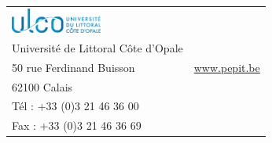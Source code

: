 \begin{titlepage}
\begin{center}
		\begin{footnotesize}
			\begin{tabular}{p{10cm} r}
			\includegraphics[width=3cm]{images/logo_ulco}
				&  \\ %
			Université de Littoral Côte d'Opale
				& \pepit{} \\
			50 rue Ferdinand Buisson 
				& \href{http://www.pepit.be}{www.pepit.be} \\
			62100 Calais
				&  \\ %
			Tél : +33 (0)3 21 46 36 00
				&  \\
			Fax : +33 (0)3 21 46 36 69
				&  \\
			\end{tabular}
		\end{footnotesize}
\end{center}

\end{titlepage}
\newpage
\null
\newpage
